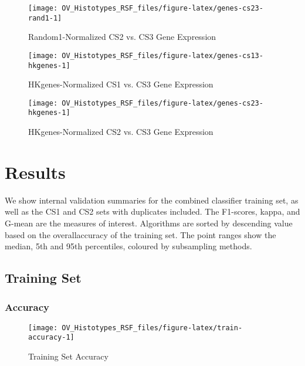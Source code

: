 \documentclass[
]{report}
\begin{document}
\begin{figure}[H]

{\centering \texttt{[image: OV\_Histotypes\_RSF\_files/figure-latex/genes-cs23-rand1-1]} 

}

\caption{Random1-Normalized CS2 vs. CS3 Gene Expression}\label{fig:genes-cs23-rand1}
\end{figure}

\begin{figure}[H]

{\centering \texttt{[image: OV\_Histotypes\_RSF\_files/figure-latex/genes-cs13-hkgenes-1]} 

}

\caption{HKgenes-Normalized CS1 vs. CS3 Gene Expression}\label{fig:genes-cs13-hkgenes}
\end{figure}

\begin{figure}[H]

{\centering \texttt{[image: OV\_Histotypes\_RSF\_files/figure-latex/genes-cs23-hkgenes-1]} 

}

\caption{HKgenes-Normalized CS2 vs. CS3 Gene Expression}\label{fig:genes-cs23-hkgenes}
\end{figure}

\hypertarget{results}{%
\chapter{Results}\label{results}}

We show internal validation summaries for the combined classifier training set, as well as the CS1 and CS2 sets with duplicates included. The F1-scores, kappa, and G-mean are the measures of interest. Algorithms are sorted by descending value based on the overallaccuracy of the training set. The point ranges show the median, 5th and 95th percentiles, coloured by subsampling methods.

\hypertarget{training-set}{%
\section{Training Set}\label{training-set}}

\hypertarget{accuracy}{%
\subsection{Accuracy}\label{accuracy}}

\begin{figure}[H]

{\centering \texttt{[image: OV\_Histotypes\_RSF\_files/figure-latex/train-accuracy-1]} 

}

\caption{Training Set Accuracy}\label{fig:train-accuracy}
\end{figure}
\end{document}
